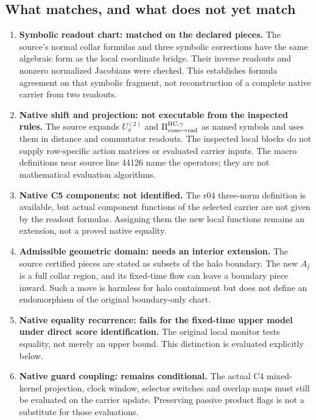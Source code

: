 \documentclass[11pt,a4paper]{article}
\begin{document}
\subsection{What matches, and what does not yet match}
\begin{enumerate}
\item \textbf{Symbolic readout chart: matched on the declared pieces.}
The source's normal collar formulas and three symbolic corrections have
the same algebraic form as the local coordinate bridge. Their inverse
readouts and nonzero normalized Jacobians were checked. This establishes
formula agreement on that symbolic fragment, not reconstruction of a
complete native carrier from two readouts.
\item \textbf{Native shift and projection: not executable from the inspected
rules.} The source expands $U_\pi^{(2)}$ and
$\Pi_{{\rm cone}\to{\rm rad}}^{{\rm HC},\gamma}$ as named symbols and
uses them in distance and commutator readouts. The inspected local blocks
do not supply row-specific action matrices or evaluated carrier inputs.
The macro definitions near source line 44126 name the operators; they are
not mathematical evaluation algorithms.
\item \textbf{Native C5 components: not identified.} The r04 three-norm
definition is available, but actual component functions of the selected
carrier are not given by the readout formulas. Assigning them the new
local functions remains an extension, not a proved native equality.
\item \textbf{Admissible geometric domain: needs an interior extension.}
The source certified pieces are stated as subsets of the halo boundary.
The new $A_j$ is a full collar region, and its fixed-time flow can leave a
boundary piece inward. Such a move is harmless for halo containment but
does not define an endomorphism of the original boundary-only chart.
\item \textbf{Native equality recurrence: fails for the fixed-time upper
model under direct score identification.} The original local monitor
tests equality, not merely an upper bound. This distinction is evaluated
explicitly below.
\item \textbf{Native guard coupling: remains conditional.} The actual C4
mixed-kernel projection, clock window, selector switches and overlap maps
must still be evaluated on the carrier update. Preserving passive product
flags is not a substitute for those evaluations.
\end{enumerate}
\end{document}

